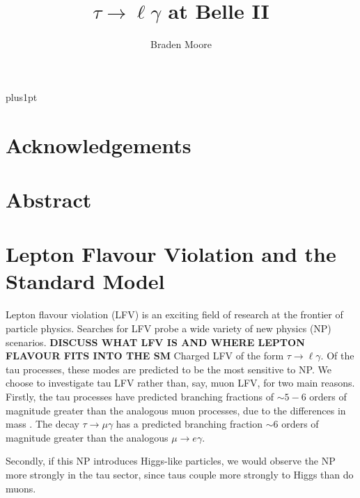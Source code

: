 \documentclass[12pt]{thesis}  %
\title{$\tau\to\ell\gamma$ at Belle II }   %
\author{Braden Moore}             %
\newcommand{\tmg}{\tau\to\mu\gamma}
\newcommand{\tlg}{\tau\to\ell\gamma}
\begin{document}
\baselineskip=18pt plus1pt

\setcounter{secnumdepth}{3}
\setcounter{tocdepth}{3}

\pagestyle{empty}
\maketitle                  %


\pagestyle{plain}
\begin{romanpages}
\tableofcontents

\chapter*{Acknowledgements}


\chapter*{Abstract}

\end{romanpages}


\chapter{Lepton Flavour Violation and the Standard Model}

Lepton flavour violation (LFV) is an exciting field of research at the frontier of particle physics. Searches for LFV probe a wide variety of new physics (NP) scenarios. \textbf{DISCUSS WHAT LFV IS AND WHERE LEPTON FLAVOUR FITS INTO THE SM} Charged LFV of the form $\tlg$. Of the tau processes, these modes are predicted to be the most sensitive to NP. We choose to investigate tau LFV rather than, say, muon LFV, for two main reasons. Firstly, the tau processes have predicted branching fractions of $\sim 5 - 6$ orders of magnitude greater than the analogous muon processes, due to the differences in mass \cite{Paradisi:2016}. The decay $\tmg$ has a predicted branching fraction $\sim 6$ orders of magnitude greater than the analogous $\mu\to e \gamma$. 

Secondly, if this NP introduces Higgs-like particles, we would observe the NP more strongly in the tau sector, since taus couple more strongly to Higgs than do muons.
\end{document}
